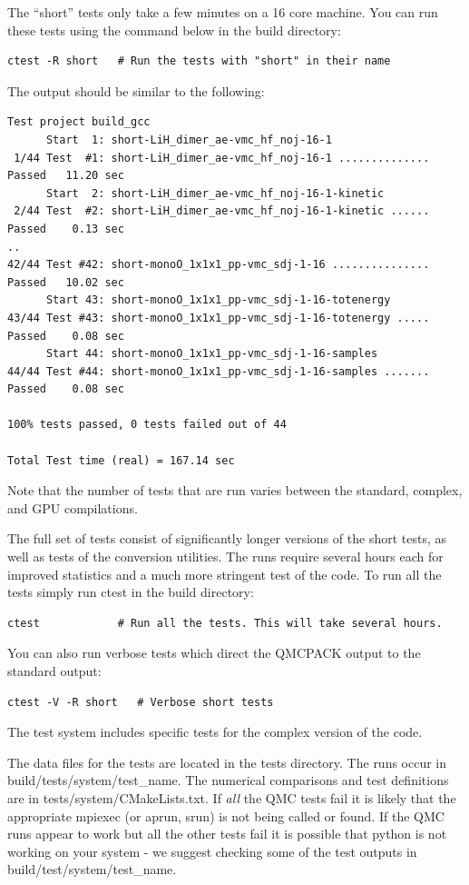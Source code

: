  The ``short'' tests only take a few minutes on a 16
core machine. You can run these tests using the command below in the
build directory:

\begin{verbatim}
ctest -R short   # Run the tests with "short" in their name
\end{verbatim}
The output should be similar to the following:
\begin{verbatim}
Test project build_gcc
      Start  1: short-LiH_dimer_ae-vmc_hf_noj-16-1
 1/44 Test  #1: short-LiH_dimer_ae-vmc_hf_noj-16-1 ..............  Passed   11.20 sec
      Start  2: short-LiH_dimer_ae-vmc_hf_noj-16-1-kinetic
 2/44 Test  #2: short-LiH_dimer_ae-vmc_hf_noj-16-1-kinetic ......  Passed    0.13 sec
..
42/44 Test #42: short-monoO_1x1x1_pp-vmc_sdj-1-16 ...............  Passed   10.02 sec
      Start 43: short-monoO_1x1x1_pp-vmc_sdj-1-16-totenergy
43/44 Test #43: short-monoO_1x1x1_pp-vmc_sdj-1-16-totenergy .....  Passed    0.08 sec
      Start 44: short-monoO_1x1x1_pp-vmc_sdj-1-16-samples
44/44 Test #44: short-monoO_1x1x1_pp-vmc_sdj-1-16-samples .......  Passed    0.08 sec

100% tests passed, 0 tests failed out of 44

Total Test time (real) = 167.14 sec
\end{verbatim}
Note that the number of tests that are run varies between the
standard, complex, and GPU compilations.

The  full set of tests consist of significantly longer versions of the short
tests, as well as tests of the conversion utilities. The runs require
several hours each for improved statistics and a much more
stringent test of the code. To run all the tests simply run ctest in the build
directory:

\begin{verbatim}
ctest            # Run all the tests. This will take several hours.
\end{verbatim}

You can also run verbose tests which direct the QMCPACK
output to the standard output:
\begin{verbatim}
ctest -V -R short   # Verbose short tests
\end{verbatim}

The test system includes specific tests for the complex version of the code.

The data files for the tests are located in the tests directory. The
runs occur in build/tests/system/test\_name. The numerical
comparisons and test definitions are in
tests/system/CMakeLists.txt. If \textit{all} the QMC tests fail it is likely
that the appropriate mpiexec (or aprun, srun) is not being
called or found. If the QMC runs appear to work but all the other
tests fail it is possible that python is not working on your system -
we suggest checking some of the test outputs in build/test/system/test\_name.

